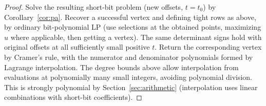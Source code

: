 \begin{proof}
Solve the resulting short-bit problem (new offsets, \(t=t_0\))
by Corollary~\ref{cor:pa}.
Recover a successful vertex and defining tight rows
as above, by ordinary bit-polynomial LP
(use selections at the obtained points, maximizing \(u\)
where applicable, then getting a vertex).
The same determinant signs hold with original offsets
at all sufficiently small positive \(t\).
Return the corresponding vertex by Cramer's rule,
with the numerator and denominator polynomials formed by Lagrange
interpolation. The degree bounds above allow interpolation from
evaluations at polynomially many small integers, avoiding polynomial
division.
This is strongly polynomial by Section~\ref{sec:arithmetic}
(interpolation uses linear combinations with short-bit coefficients).
\end{proof}
